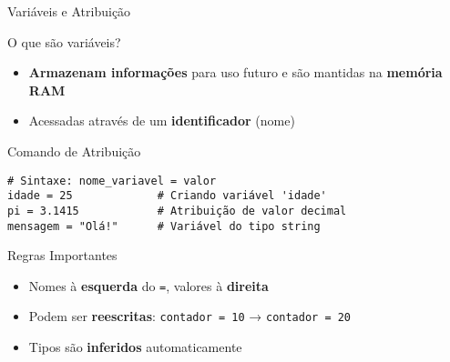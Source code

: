 \begin{frame}[fragile]{Variáveis e Atribuição}

\begin{block}{O que são variáveis?}
\begin{itemize}
    \item \textbf{Armazenam informações} para uso futuro e são mantidas na \textbf{memória RAM}
    \item Acessadas através de um \textbf{identificador} (nome)
\end{itemize}
\end{block}

\begin{exampleblock}{Comando de Atribuição}
\begin{verbatim}
# Sintaxe: nome_variavel = valor
idade = 25             # Criando variável 'idade'
pi = 3.1415            # Atribuição de valor decimal
mensagem = "Olá!"      # Variável do tipo string
\end{verbatim}
\end{exampleblock}

\begin{alertblock}{Regras Importantes}
\begin{itemize}
    \item Nomes à \textbf{esquerda} do \texttt{=}, valores à \textbf{direita}
    \item Podem ser \textbf{reescritas}: \texttt{contador = 10} → \texttt{contador = 20}
    \item Tipos são \textbf{inferidos} automaticamente
\end{itemize}
\end{alertblock}
\end{frame}

